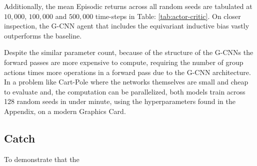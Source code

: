 Additionally, the mean Episodic returns across all random seeds are tabulated at $10,000$, $100,000$ and $500,000$ time-steps in Table: \ref{tab:actor-critic}. On closer inspection, the G-CNN agent that includes the equivariant inductive bias vastly outperforms the baseline.

Despite the similar parameter count, because of the structure of the G-CNNs the forward passes are more expensive to compute, requiring the number of group actions times more operations in a forward pass due to the G-CNN architecture. In a problem like Cart-Pole where the networks themselves are small and cheap to evaluate and, the computation can be parallelized, both models train across 128 random seeds in under minute, using the hyperparameters found in the Appendix, on a modern Graphics Card.

\subsection{Catch}
To demonstrate that the







